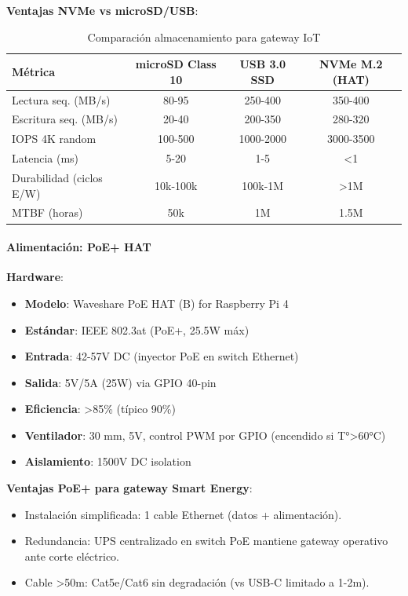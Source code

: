 \textbf{Ventajas NVMe vs microSD/USB}:
\begin{table}[h]
\centering
\small
\begin{tabular}{|l|c|c|c|}
\hline
\textbf{Métrica} & \textbf{microSD Class 10} & \textbf{USB 3.0 SSD} & \textbf{NVMe M.2 (HAT)} \\
\hline
Lectura seq. (MB/s) & 80-95 & 250-400 & 350-400 \\
Escritura seq. (MB/s) & 20-40 & 200-350 & 280-320 \\
IOPS 4K random & 100-500 & 1000-2000 & 3000-3500 \\
Latencia (ms) & 5-20 & 1-5 & <1 \\
Durabilidad (ciclos E/W) & 10k-100k & 100k-1M & >1M \\
MTBF (horas) & 50k & 1M & 1.5M \\
\hline
\end{tabular}
\caption{Comparación almacenamiento para gateway IoT}
\end{table}

\paragraph{Alimentación: PoE+ HAT}

\textbf{Hardware}:
\begin{itemize}
    \item \textbf{Modelo}: Waveshare PoE HAT (B) for Raspberry Pi 4
    \item \textbf{Estándar}: IEEE 802.3at (PoE+, 25.5W máx)
    \item \textbf{Entrada}: 42-57V DC (inyector PoE en switch Ethernet)
    \item \textbf{Salida}: 5V/5A (25W) via GPIO 40-pin
    \item \textbf{Eficiencia}: >85\% (típico 90\%)
    \item \textbf{Ventilador}: 30 mm, 5V, control PWM por GPIO (encendido si T°>60°C)
    \item \textbf{Aislamiento}: 1500V DC isolation
\end{itemize}

\textbf{Ventajas PoE+ para gateway Smart Energy}:
\begin{itemize}
    \item Instalación simplificada: 1 cable Ethernet (datos + alimentación).
    \item Redundancia: UPS centralizado en switch PoE mantiene gateway operativo ante corte eléctrico.
    \item Cable >50m: Cat5e/Cat6 sin degradación (vs USB-C limitado a 1-2m).
\end{itemize}

